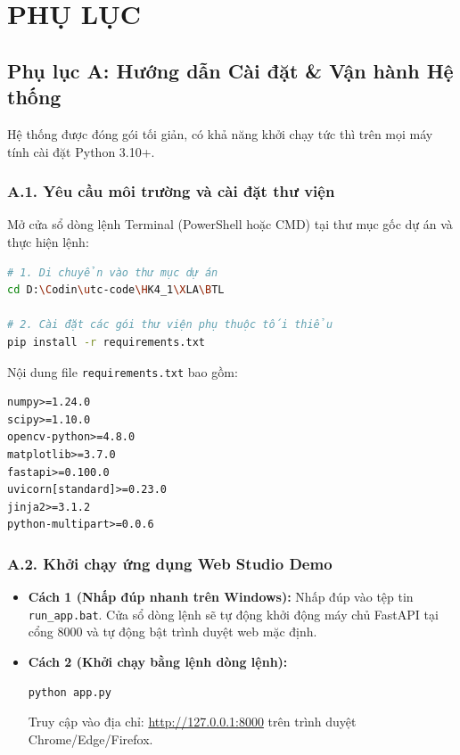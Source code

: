 \chapter*{PHỤ LỤC}
\label{ch:phu_luc}

\section*{Phụ lục A: Hướng dẫn Cài đặt \& Vận hành Hệ thống}

Hệ thống được đóng gói tối giản, có khả năng khởi chạy tức thì trên mọi máy tính cài đặt Python 3.10+.

\subsection*{A.1. Yêu cầu môi trường và cài đặt thư viện}
Mở cửa sổ dòng lệnh Terminal (PowerShell hoặc CMD) tại thư mục gốc dự án và thực hiện lệnh:
\begin{lstlisting}[language=bash]
# 1. Di chuyển vào thư mục dự án
cd D:\Codin\utc-code\HK4_1\XLA\BTL

# 2. Cài đặt các gói thư viện phụ thuộc tối thiểu
pip install -r requirements.txt
\end{lstlisting}

Nội dung file \texttt{requirements.txt} bao gồm:
\begin{lstlisting}[language=text]
numpy>=1.24.0
scipy>=1.10.0
opencv-python>=4.8.0
matplotlib>=3.7.0
fastapi>=0.100.0
uvicorn[standard]>=0.23.0
jinja2>=3.1.2
python-multipart>=0.0.6
\end{lstlisting}

\subsection*{A.2. Khởi chạy ứng dụng Web Studio Demo}
\begin{itemize}
    \item \textbf{Cách 1 (Nhấp đúp nhanh trên Windows):} Nhấp đúp vào tệp tin \texttt{run\_app.bat}. Cửa sổ dòng lệnh sẽ tự động khởi động máy chủ FastAPI tại cổng 8000 và tự động bật trình duyệt web mặc định.
    \item \textbf{Cách 2 (Khởi chạy bằng lệnh dòng lệnh):}
    \begin{lstlisting}[language=bash]
python app.py
    \end{lstlisting}
    Truy cập vào địa chỉ: \url{http://127.0.0.1:8000} trên trình duyệt Chrome/Edge/Firefox.
\end{itemize}

